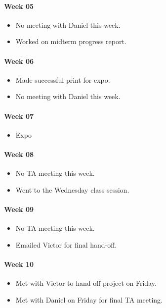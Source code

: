 \paragraph{Week 05}
\begin{itemize}
\item No meeting with Daniel this week.
\item Worked on midterm progress report.
\end{itemize}
\paragraph{Week 06}
\begin{itemize}
\item Made successful print for expo.
\item No meeting with Daniel this week.
\end{itemize}
\paragraph{Week 07}
\begin{itemize}
\item Expo
\end{itemize}
\paragraph{Week 08}
\begin{itemize}
\item No TA meeting this week. 
\item Went to the Wednesday class session. 
\end{itemize}
\paragraph{Week 09}
\begin{itemize}
\item No TA meeting this week.
\item Emailed Victor for final hand-off. 
\end{itemize}
\paragraph{Week 10}
\begin{itemize}
\item Met with Victor to hand-off project on Friday.
\item Met with Daniel on Friday for final TA meeting. 
\end{itemize}